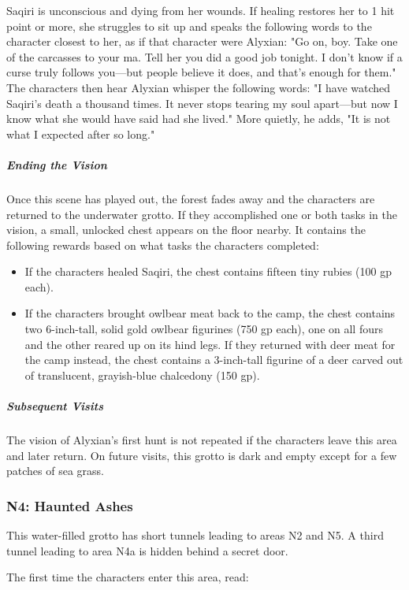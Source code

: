 \documentclass[10pt,a4paper,twoside,fancy,bg=print,twocolumn,openany,nodeprecatedcode]{dndbook}
\begin{document}
Saqiri is unconscious and dying from her wounds. If healing restores her to 1 hit point or more, she struggles to sit up and speaks the following words to the character closest to her, as if that character were Alyxian: "Go on, boy. Take one of the carcasses to your ma. Tell her you did a good job tonight. I don't know if a curse truly follows you—but people believe it does, and that's enough for them." The characters then hear Alyxian whisper the following words: "I have watched Saqiri's death a thousand times. It never stops tearing my soul apart—but now I know what she would have said had she lived." More quietly, he adds, "It is not what I expected after so long."

\subparagraph{Ending the Vision}
Once this scene has played out, the forest fades away and the characters are returned to the underwater grotto. If they accomplished one or both tasks in the vision, a small, unlocked chest appears on the floor nearby. It contains the following rewards based on what tasks the characters completed:


\begin{itemize}
\item If the characters healed Saqiri, the chest contains fifteen tiny rubies (100 gp each).
\item If the characters brought owlbear meat back to the camp, the chest contains two 6-inch-tall, solid gold owlbear figurines (750 gp each), one on all fours and the other reared up on its hind legs. If they returned with deer meat for the camp instead, the chest contains a 3-inch-tall figurine of a deer carved out of translucent, grayish-blue chalcedony (150 gp).
\end{itemize}

\subparagraph{Subsequent Visits}
The vision of Alyxian's first hunt is not repeated if the characters leave this area and later return. On future visits, this grotto is dark and empty except for a few patches of sea grass.

\subsubsection{N4: Haunted Ashes}
This water-filled grotto has short tunnels leading to areas N2 and N5. A third tunnel leading to area N4a is hidden behind a secret door.

The first time the characters enter this area, read:
\end{document}
